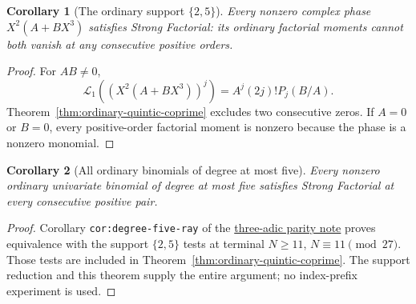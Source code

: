 \documentclass[11pt]{article}
\newtheorem{corollary}{Corollary}
\begin{document}
\begin{corollary}[The ordinary support $\{2,5\}$]
\label{cor:quintic-sfc}
Every nonzero complex phase $X^2(A+BX^3)$ satisfies Strong Factorial:
its ordinary factorial moments cannot both vanish at any consecutive
positive orders.
\end{corollary}
\begin{proof}
For $AB\ne0$,
\[
 \mathcal L_1((X^2(A+BX^3))^j)=A^j(2j)!P_j(B/A).
\]
Theorem~\ref{thm:ordinary-quintic-coprime} excludes two consecutive
zeros. If $A=0$ or $B=0$, every positive-order factorial moment
is nonzero because the phase is a nonzero monomial.
\end{proof}

\begin{corollary}[All ordinary binomials of degree at most five]
\label{cor:degree-five-sfc}
Every nonzero ordinary univariate binomial of degree at most five
satisfies Strong Factorial at every consecutive positive pair.
\end{corollary}
\begin{proof}
Corollary \texttt{cor:degree-five-ray} of the
\href{QUINTIC_THREE_ADIC_PARITY_REDUCTION.tex}{three-adic parity note}
proves equivalence with the support $\{2,5\}$ tests at terminal
$N\ge11$, $N\equiv11\pmod{27}$.
Those tests are included in
Theorem~\ref{thm:ordinary-quintic-coprime}.
The support reduction and this theorem supply the entire argument;
no index-prefix experiment is used.
\end{proof}
\end{document}
